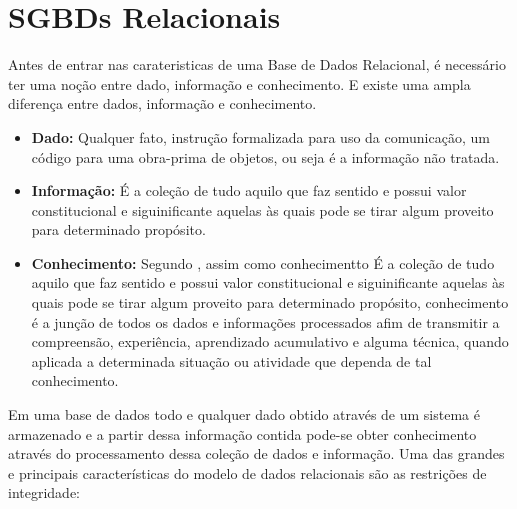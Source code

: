 \section{SGBDs Relacionais}
Antes de entrar nas carateristicas de uma Base de Dados Relacional, é necessário ter uma noção entre dado, informação e conhecimento. E existe uma ampla diferença entre dados, informação e conhecimento.
\begin{itemize}
  \item{ \textbf{ Dado: } Qualquer fato, instrução formalizada para uso da comunicação, um código para uma obra-prima de objetos, ou seja é a informação não tratada.
  
  }

  \item{ \textbf{ Informação: } É a coleção de tudo aquilo que faz sentido e possui valor constitucional e siguinificante aquelas às quais pode se tirar algum proveito para determinado propósito.
  
  }
  
  \item{ \textbf{ Conhecimento: } Segundo \cite{MCLEAN_WETHERBE}, assim como conhecimentto É a coleção de tudo aquilo que faz sentido e possui valor constitucional e siguinificante 
    aquelas às quais pode se tirar algum proveito para determinado propósito, conhecimento é a junção de todos os dados e informações processados afim de transmitir
    a compreensão, experiência, aprendizado acumulativo e alguma técnica, quando aplicada a determinada situação ou atividade que dependa de tal conhecimento. 
  }
\end{itemize}

Em uma base de dados todo e qualquer dado obtido através de um sistema é armazenado e a partir dessa informação contida pode-se obter conhecimento através do processamento
dessa coleção de dados e informação. Uma das grandes e principais características do modelo de dados relacionais são as restrições de integridade:

